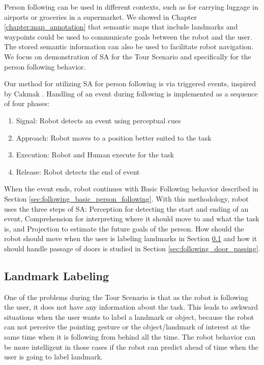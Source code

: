 Person following can be used in different contexts, such as for carrying luggage in airports or groceries in a supermarket. We showed in Chapter \ref{chapter:map_annotation} that semantic maps that include landmarks and waypoints could be used to communicate goals between the robot and the user.  The stored semantic information can also be used to facilitate robot navigation. We focus on demonstration of SA for the Tour Scenario and specifically for the person following behavior.

Our method for utilizing SA for person following is via triggered events, inspired by Cakmak \cite{cakmak2011using}. Handling of an event during following is implemented as a sequence of four phases:

\begin{enumerate}
\item Signal: Robot detects an event using perceptual cues
\item Approach: Robot moves to a position better suited to the task
\item Execution: Robot and Human execute for the task
\item Release: Robot detects the end of event
\end{enumerate}

When the event ends, robot continues with Basic Following behavior described in Section \ref{sec:following_basic_person_following}. With this methodology, robot uses the three steps of SA: Perception for detecting the start and ending of an event, Comprehension for interpreting where it should move to and what the task is, and Projection to estimate the future goals of the person. How should the robot should move when the user is labeling landmarks in Section \ref{sec:following_landmark_labeling} and how it should handle passage of doors is studied in Section \ref{sec:following_door_passing}.



\subsection{Landmark Labeling}
\label{sec:following_landmark_labeling}

One of the problems during the Tour Scenario is that as the robot is following the user, it does not have any information about the task. This leads to awkward situations when the user wants to label a landmark or object, because the robot can not perceive the pointing gesture or the object/landmark of interest at the same time when it is following from behind all the time. The robot behavior can be more intelligent in those cases if the robot can predict ahead of time when the user is going to label landmark.

